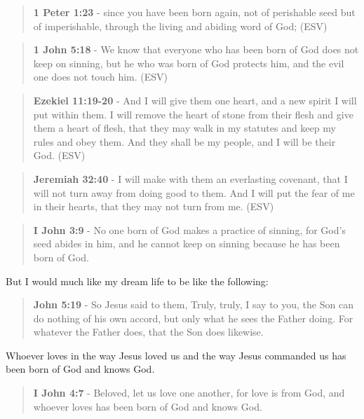 \documentclass[11pt]{article}
\begin{document}
\begin{quote}
\textbf{1 Peter 1:23} - since you have been born again, not of perishable seed but of imperishable, through the living and abiding word of God; (ESV)
\end{quote}

\begin{quote}
\textbf{1 John 5:18} - We know that everyone who has been born of God does not keep on sinning, but he who was born of God protects him, and the evil one does not touch him. (ESV)
\end{quote}

\begin{quote}
\textbf{Ezekiel 11:19-20} - And I will give them one heart, and a new spirit I will put within them. I will remove the heart of stone from their flesh and give them a heart of flesh, that they may walk in my statutes and keep my rules and obey them. And they shall be my people, and I will be their God. (ESV)
\end{quote}

\begin{quote}
\textbf{Jeremiah 32:40} - I will make with them an everlasting covenant, that I will not turn away from doing good to them. And I will put the fear of me in their hearts, that they may not turn from me. (ESV)
\end{quote}

\begin{quote}
\textbf{I John 3:9} - No one born of God makes a practice of sinning, for God's seed abides in him, and he cannot keep on sinning because he has been born of God.
\end{quote}

But I would much like my dream life to be like the following:

\begin{quote}
\textbf{John 5:19} - So Jesus said to them, Truly, truly, I say to you, the Son can do nothing of his own accord, but only what he sees the Father doing. For whatever the Father does, that the Son does likewise.
\end{quote}

Whoever loves in the way Jesus loved us and the way Jesus commanded us has been born of God and knows God.

\begin{quote}
\textbf{I John 4:7} - Beloved, let us love one another, for love is from God, and whoever loves has been born of God and knows God.
\end{quote}
\end{document}
